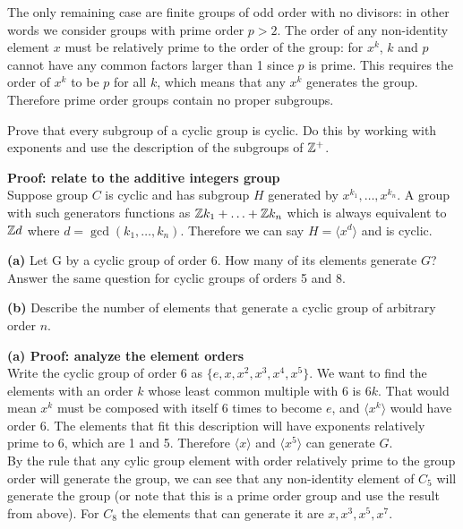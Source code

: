 \documentclass{article}
\begin{document}
The only remaining case are finite groups of odd order with no divisors: in other words we consider groups with prime order $p > 2$. The order of any non-identity element $x$ must be relatively prime to the order of the group: for $x^k$, $k$ and $p$ cannot have any common factors larger than 1 since $p$ is prime. This requires the order of $x^k$ to be $p$ for all $k$, which means that any $x^k$ generates the group. Therefore prime order groups contain no proper subgroups.

\begin{problem}
Prove that every subgroup of a cyclic group is cyclic. Do this by working with exponents and use the description of the subgroups of $\mathbb{Z}^+$.
\end{problem}

\textbf{Proof: relate to the additive integers group}
\\

Suppose group $C$ is cyclic and has subgroup $H$ generated by $x^{k_1}, \ldots, x^{k_n}$. A group with such generators functions as $\mathbb{Z} k_1 + \ldots + \mathbb{Z} k_n$ which is always equivalent to $\mathbb{Z} d$ where $d = \gcd(k_1, \ldots, k_n)$. Therefore we can say $H = \langle x^d \rangle$ and is cyclic.

\begin{problem}
\textbf{(a)} Let G by a cyclic group of order 6. How many of its elements generate $G$? Answer the same question for cyclic groups of orders 5 and 8.

\textbf{(b)} Describe the number of elements that generate a cyclic group of arbitrary order $n$.
\end{problem}
\textbf{(a) Proof: analyze the element orders}
\\
Write the cyclic group of order 6 as $\{e, x, x^2, x^3, x^4, x^5\}$. We want to find the elements with an order $k$ whose least common multiple with 6 is $6k$. That would mean $x^k$ must be composed with itself 6 times to become $e$, and $\langle x^k \rangle$ would have order 6. The elements that fit this description will have exponents relatively prime to 6, which are 1 and 5. Therefore $\langle x \rangle$ and $\langle x^5 \rangle$ can generate $G$.
\\

By the rule that any cylic group element with order relatively prime to the group order will generate the group, we can see that any non-identity element of $C_5$ will generate the group (or note that this is a prime order group and use the result from above). For $C_8$ the elements that can generate it are $x, x^3, x^5, x^7$.
\end{document}
